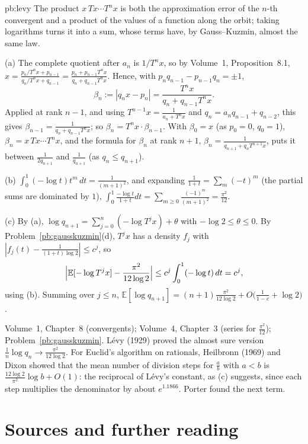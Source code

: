 \begin{solution}{pb:levy}
\idea The product $x\,Tx\cdots T^nx$ is both the approximation error of the $n$-th convergent and a product of the values of a
function along the orbit; taking logarithms turns it into a sum, whose terms have, by Gauss--Kuzmin, almost the same law.

\writeup (a) The complete quotient after $a_n$ is $1/T^nx$, so by Volume~1, Proposition~8.1, $x=\frac{p_n/T^nx+p_{n-1}}{q_n/T^nx+q_{n-1}}=\frac{p_n+p_{n-1}T^nx}{q_n+q_{n-1}T^nx}$.
Hence, with $p_nq_{n-1}-p_{n-1}q_n=\pm1$,
\[
\beta_n:=|q_nx-p_n|=\frac{T^nx}{q_n+q_{n-1}T^nx}.
\]
Applied at rank $n-1$, and using $T^{n-1}x=\frac1{a_n+T^nx}$ and $q_n=a_nq_{n-1}+q_{n-2}$, this gives $\beta_{n-1}=\frac1{q_n+q_{n-1}T^nx}$;
so $\beta_n=T^nx\cdot\beta_{n-1}$. With $\beta_0=x$ (as $p_0=0$, $q_0=1$), $\beta_n=x\,Tx\cdots T^nx$, and the formula for $\beta_n$ at rank
$n+1$, $\beta_n=\frac1{q_{n+1}+q_nT^{n+1}x}$, puts it between $\frac1{2q_{n+1}}$ and $\frac1{q_{n+1}}$ (as $q_n\le q_{n+1}$).

(b) $\int_0^1(-\log t)t^m\,dt=\frac1{(m+1)^2}$, and expanding $\frac1{1+t}=\sum_m(-t)^m$ (the partial sums are dominated by $1$),
$\int_0^1\frac{-\log t}{1+t}dt=\sum_{m\ge0}\frac{(-1)^m}{(m+1)^2}=\frac{\pi^2}{12}$.

(c) By (a), $\log q_{n+1}=\sum_{j=0}^n(-\log T^jx)+\theta$ with $-\log2\le\theta\le0$. By Problem~\ref{pb:gausskuzmin}(d), $T^jx$ has a density
$f_j$ with $|f_j(t)-\frac1{(1+t)\log2}|\le c^j$, so
\[
\Bigl|\mathbb E[-\log T^jx]-\frac{\pi^2}{12\log2}\Bigr|\le c^j\int_0^1(-\log t)\,dt=c^j,
\]
using (b). Summing over $j\le n$, $\mathbb E[\log q_{n+1}]=(n+1)\frac{\pi^2}{12\log2}+O\bigl(\frac1{1-c}+\log2\bigr)$.

\tools Volume~1, Chapter~8 (convergents); Volume~4, Chapter~3 (series for $\frac{\pi^2}{12}$); Problem~\ref{pb:gausskuzmin}.
\leads Lévy (1929) proved the almost sure version $\frac1n\log q_n\to\frac{\pi^2}{12\log2}$. For Euclid's algorithm on rationals,
Heilbronn (1969) and Dixon showed that the mean number of division steps for $\frac ab$ with $a<b$ is $\frac{12\log2}{\pi^2}\log b+O(1)$:
the reciprocal of Lévy's constant, as (c) suggests, since each step multiplies the denominator by about $e^{1.1866}$. Porter found
the next term.
\end{solution}

\section*{Sources and further reading}

